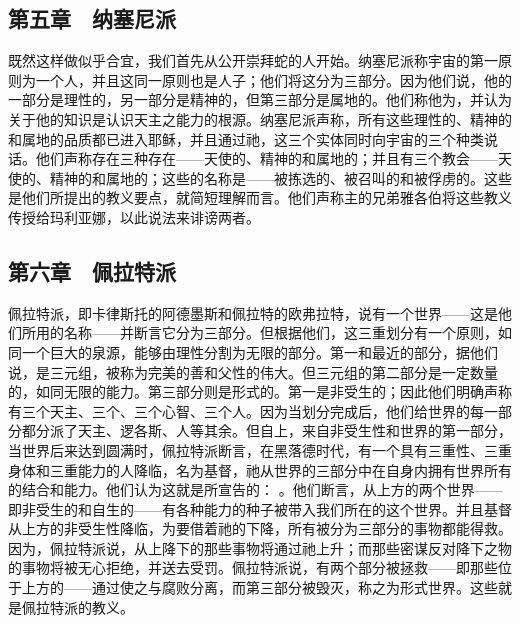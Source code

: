 
\subsection{第五章　纳塞尼派}

既然这样做似乎合宜，我们首先从公开崇拜蛇的人开始。纳塞尼派称宇宙的第一原则为一个人，并且这同一原则也是人子；他们将这分为三部分。因为他们说，他的一部分是理性的，另一部分是精神的，但第三部分是属地的。他们称他为，并认为关于他的知识是认识天主之能力的根源。纳塞尼派声称，所有这些理性的、精神的和属地的品质都已进入耶稣，并且通过祂，这三个实体同时向宇宙的三个种类说话。他们声称存在三种存在——天使的、精神的和属地的；并且有三个教会——天使的、精神的和属地的；这些的名称是——被拣选的、被召叫的和被俘虏的。这些是他们所提出的教义要点，就简短理解而言。他们声称主的兄弟雅各伯将这些教义传授给玛利亚娜，以此说法来诽谤两者。\par


\subsection{第六章　佩拉特派}

佩拉特派，即卡律斯托的阿德墨斯和佩拉特的欧弗拉特，说有一个世界——这是他们所用的名称——并断言它分为三部分。但根据他们，这三重划分有一个原则，如同一个巨大的泉源，能够由理性分割为无限的部分。第一和最近的部分，据他们说，是三元组，被称为完美的善和父性的伟大。但三元组的第二部分是一定数量的，如同无限的能力。第三部分则是形式的。第一是非受生的；因此他们明确声称有三个天主、三个、三个心智、三个人。因为当划分完成后，他们给世界的每一部分都分派了天主、逻各斯、人等其余。但自上，来自非受生性和世界的第一部分，当世界后来达到圆满时，佩拉特派断言，在黑落德时代，有一个具有三重性、三重身体和三重能力的人降临，名为基督，祂从世界的三部分中在自身内拥有世界所有的结合和能力。他们认为这就是所宣告的： 。他们断言，从上方的两个世界——即非受生的和自生的——有各种能力的种子被带入我们所在的这个世界。并且基督从上方的非受生性降临，为要借着祂的下降，所有被分为三部分的事物都能得救。因为，佩拉特派说，从上降下的那些事物将通过祂上升；而那些密谋反对降下之物的事物将被无心拒绝，并送去受罚。佩拉特派说，有两个部分被拯救——即那些位于上方的——通过使之与腐败分离，而第三部分被毁灭，称之为形式世界。这些就是佩拉特派的教义。\par

